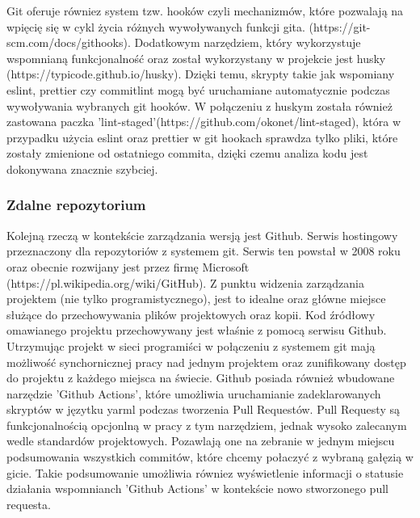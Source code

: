 Git oferuje równiez system tzw. hooków czyli mechanizmów, które pozwalają na wpięcię się w cykl życia różnych wywoływanych funkcji gita. (https://git-scm.com/docs/githooks). Dodatkowym narzędziem, który wykorzystuje wspomnianą funkcjonalność oraz został wykorzystany w projekcie jest husky (https://typicode.github.io/husky). Dzięki temu, skrypty takie jak wspomiany eslint, prettier czy commitlint mogą być uruchamiane automatycznie podczas wywoływania wybranych git hooków. W połączeniu z huskym została również zastowana paczka 'lint-staged'(https://github.com/okonet/lint-staged), która w przypadku użycia eslint oraz prettier w git hookach sprawdza tylko pliki, które zostały zmienione od ostatniego commita, dzięki czemu analiza kodu jest dokonywana znacznie szybciej.

\subsubsection{Zdalne repozytorium}

Kolejną rzeczą w kontekście zarządzania wersją jest Github. Serwis hostingowy przeznaczony dla repozytoriów z systemem git. Serwis ten powstał w 2008 roku oraz obecnie rozwijany jest przez firmę Microsoft (https://pl.wikipedia.org/wiki/GitHub). Z punktu widzenia zarządzania projektem (nie tylko programistycznego), jest to idealne oraz główne miejsce służące do przechowywania plików projektowych oraz kopii. Kod źródłowy omawianego projektu przechowywany jest właśnie z pomocą serwisu Github. Utrzymując projekt w sieci programiści w połączeniu z systemem git mają możliwość synchornicznej pracy nad jednym projektem oraz zunifikowany dostęp do projektu z każdego miejsca na świecie. Github posiada również wbudowane narzędzie 'Github Actions', które umożliwia uruchamianie zadeklarowanych skryptów w języtku yarml podczas tworzenia Pull Requestów. Pull Requesty są funkcjonalnością opcjonlną w pracy z tym narzędziem, jednak wysoko zalecanym wedle standardów projektowych. Pozawlają one na zebranie w jednym miejscu podsumowania wszystkich commitów, które chcemy połaczyć z wybraną gałęzią w gicie. Takie podsumowanie umożliwia równiez wyświetlenie informacji o statusie działania wspomnianch 'Github Actions' w kontekście nowo stworzonego pull requesta.